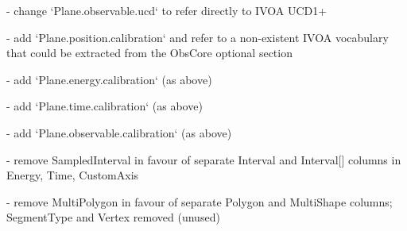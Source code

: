 \documentclass[11pt,a4paper]{ivoa}
\begin{document}
- change `Plane.observable.ucd` to refer directly to IVOA UCD1+

- add `Plane.position.calibration` and refer to a non-existent IVOA vocabulary that could be extracted from the ObsCore optional section

- add `Plane.energy.calibration` (as above)

- add `Plane.time.calibration` (as above)

- add `Plane.observable.calibration` (as above)

- remove SampledInterval in favour of separate Interval and Interval[] columns in Energy, Time, CustomAxis

- remove MultiPolygon in favour of separate Polygon and MultiShape columns; SegmentType and Vertex removed (unused)


\end{document}
